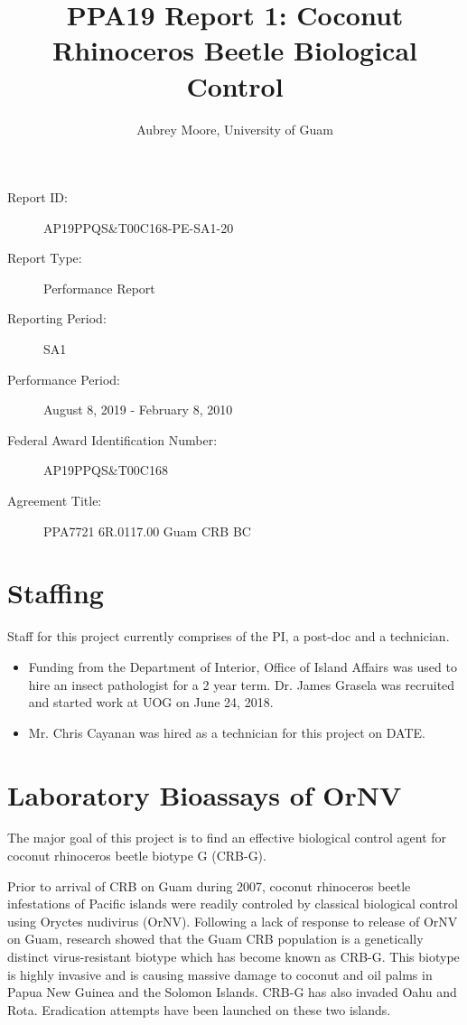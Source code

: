 \documentclass[12pt,letterpaper,english]{scrartcl}
\begin{document}
\title{PPA19 Report 1: Coconut Rhinoceros Beetle Biological Control}
\author{Aubrey Moore, University of Guam}
\maketitle
\begin{description}	
	\item[Report ID:] AP19PPQS\&T00C168-PE-SA1-20
	\item[Report Type:] Performance Report
	\item[Reporting Period:]  SA1
	\item[Performance Period:] August 8, 2019 - February 8, 2010
\item[Federal Award Identification Number:] AP19PPQS\&T00C168
\item[Agreement Title:] PPA7721 6R.0117.00 Guam CRB BC
\end{description}

\newpage
\tableofcontents{}

\newpage{}

\section{Staffing}

Staff for this project currently comprises of the PI, a post-doc and
a technician. 

\begin{itemize}
	
\item Funding from the Department of Interior, Office of Island Affairs
was used to hire an insect pathologist for a 2 year term. Dr. James
Grasela was recruited and started work at UOG on June 24, 2018.

\item Mr. Chris Cayanan was hired as a technician for this project on DATE.

\end{itemize}

\section{Laboratory Bioassays of OrNV}

The major goal of this project is to find an effective biological
control agent for coconut rhinoceros beetle biotype G (CRB-G). 

Prior to arrival of CRB on Guam during 2007, coconut rhinoceros beetle
infestations of Pacific islands were readily controled by classical
biological control using Oryctes nudivirus (OrNV). Following a lack
of response to release of OrNV on Guam, research showed that the Guam
CRB population is a genetically distinct virus-resistant biotype which
has become known as CRB-G. This biotype is highly invasive and is
causing massive damage to coconut and oil palms in Papua New Guinea
and the Solomon Islands. CRB-G has also invaded Oahu and Rota. Eradication
attempts have been launched on these two islands. 
\end{document}
